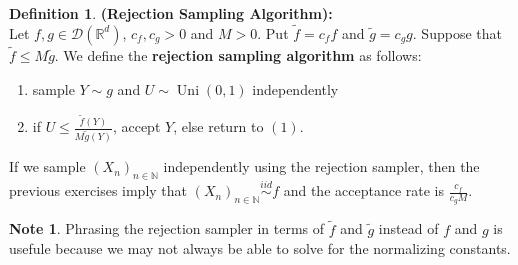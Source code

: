 \documentclass[12pt]{amsart}
\theoremstyle{definition}
\newtheorem{defn}[definition]{Definition}
\newtheorem{note}[definition]{Note}
\newcommand{\N}{\mathbb{N}}
\newcommand{\R}{\mathbb{R}}
\newcommand{\MD}{\mathcal{D}}
\newcommand{\iid}{\stackrel{iid}{\sim}}
\DeclareMathOperator{\uni}{Uni}
\begin{document}
	\begin{defn}\textbf{(Rejection Sampling Algorithm):} \\
		Let $f, g \in \MD(\R^d)$, $c_f,c_g>0$ and $M > 0$. Put $\tilde{f} = c_f f$ and $\tilde{g} = c_g g$. Suppose that $\tilde{f} \leq M \tilde{g}$. We define the \textbf{rejection sampling algorithm} as follows:
		\begin{enumerate}
			\item sample $Y \sim g$ and $U \sim \uni(0,1)$ independently
			\item if $U \leq \frac{\tilde{f}(Y)}{M\tilde{g}(Y)} $, accept $Y$, else return to $(1)$.
		\end{enumerate}
		If we sample $(X_n)_{n \in \N}$ independently using the rejection sampler, then the previous exercises imply that $(X_n)_{n \in \N} \iid f$ and the acceptance rate is $\frac{c_f}{c_gM}$.
	\end{defn}

	\begin{note}
		Phrasing the rejection sampler in terms of $\tilde{f}$ and $\tilde{g}$ instead of $f$ and $g$ is usefule because we may not always be able to solve for the normalizing constants.
	\end{note}

	
\end{document}
